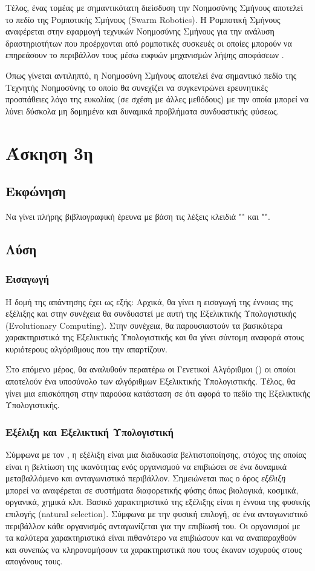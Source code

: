 \documentclass{assignment}
\begin{document}
Τέλος, ένας τομέας με σημαντικότατη διείσδυση την Νοημοσύνης Σμήνους αποτελεί
το πεδίο της Ρομποτικής Σμήνους (Swarm Robotics). Η Ρομποτική Σμήνους αναφέρεται
στην εφαρμογή τεχνικών Νοημοσύνης Σμήνους για την ανάλυση δραστηριοτήτων που
προέρχονται από ρομποτικές συσκευές οι οποίες μπορούν να επηρεάσουν το
περιβάλλον τους μέσω ευφυών μηχανισμών λήψης αποφάσεων \cite{jevtic2007swarm}.

Όπως γίνεται αντιληπτό, η Νοημοσύνη Σμήνους αποτελεί ένα σημαντικό πεδίο της
Τεχνητής Νοημοσύνης το οποίο θα συνεχίζει να συγκεντρώνει ερευνητικές
προσπάθειες λόγο της ευκολίας (σε σχέση με άλλες μεθόδους) με την οποία μπορεί
να λύνει δύσκολα μη δομημένα και δυναμικά προβλήματα συνδυαστικής φύσεως.
\section{Άσκηση 3η}
\subsection{Εκφώνηση}

Να γίνει πλήρης βιβλιογραφική έρευνα με βάση τις λέξεις κλειδιά "" και "".

\subsection {Λύση}
\subsubsection*{Εισαγωγή}
Η δομή της απάντησης έχει ως εξής: Αρχικά, θα γίνει η εισαγωγή της έννοιας
της εξέλιξης και στην συνέχεια θα συνδυαστεί με αυτή της Εξελικτικής
Υπολογιστικής (Evolutionary Computing). Στην συνέχεια, θα παρουσιαστούν τα
βασικότερα χαρακτηριστικά της Εξελικτικής Υπολογιστικής και θα γίνει
σύντομη αναφορά στους κυριότερους αλγόριθμους που την απαρτίζουν.

Στο επόμενο μέρος, θα αναλυθούν περαιτέρω οι Γενετικοί Αλγόριθμοι () οι οποίοι αποτελούν ένα υποσύνολο των αλγόριθμων Εξελικτικής
Υπολογιστικής. Τέλος, θα γίνει μια επισκόπηση στην παρούσα κατάσταση σε ότι
αφορά το πεδίο της Εξελικτικής Υπολογιστικής.
\subsubsection*{Εξέλιξη και Εξελικτική Υπολογιστική}
Σύμφωνα με τον \citet{darwin1859origins}, η εξέλιξη είναι μια διαδικασία
βελτιστοποίησης, στόχος της οποίας είναι η βελτίωση της ικανότητας ενός
οργανισμού να επιβιώσει σε ένα δυναμικά μεταβαλλόμενο και ανταγωνιστικό
περιβάλλον. Σημειώνεται πως ο όρος \emph{εξέλιξη} μπορεί να αναφέρεται σε
συστήματα διαφορετικής φύσης όπως βιολογικά, κοσμικά, οργανικά, χημικά κλπ. 
Βασικό χαρακτηριστικό της εξέλιξης είναι η έννοια της φυσικής επιλογής
(natural selection). Σύμφωνα με την φυσική επιλογή, σε ένα ανταγωνιστικό
περιβάλλον κάθε οργανισμός ανταγωνίζεται για την επιβίωσή του. Οι οργανισμοί
με τα καλύτερα χαρακτηριστικά είναι πιθανότερο να επιβιώσουν και να αναπαραχθούν
και συνεπώς να κληρονομήσουν τα χαρακτηριστικά που τους έκαναν ισχυρούς στους
απογόνους τους.
\end{document}
